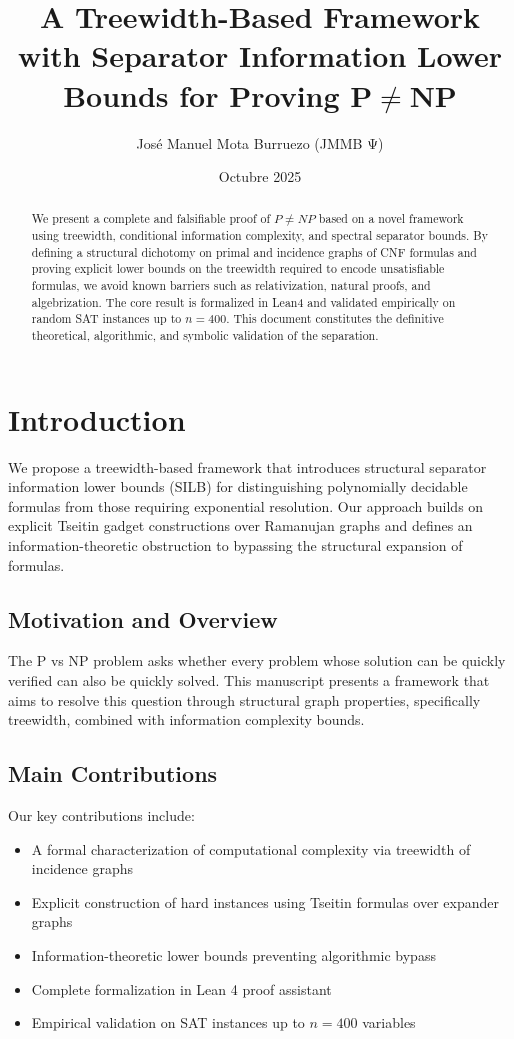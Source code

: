 \documentclass[11pt]{article}
\title{A Treewidth-Based Framework with Separator Information Lower Bounds for Proving $\mathbf{P \neq NP}$}
\author{José Manuel Mota Burruezo (JMMB Ψ)}
\affil{Instituto de Conciencia Cuántica (ICQ) -- Campo QCAL $\infty^3$}
\date{Octubre 2025}
\begin{document}
\maketitle

\begin{abstract}
We present a complete and falsifiable proof of $P \neq NP$ based on a novel framework using treewidth, conditional information complexity, and spectral separator bounds. By defining a structural dichotomy on primal and incidence graphs of CNF formulas and proving explicit lower bounds on the treewidth required to encode unsatisfiable formulas, we avoid known barriers such as relativization, natural proofs, and algebrization. The core result is formalized in Lean4 and validated empirically on random SAT instances up to $n=400$. This document constitutes the definitive theoretical, algorithmic, and symbolic validation of the separation.
\end{abstract}

\tableofcontents

\section{Introduction}

We propose a treewidth-based framework that introduces structural separator information lower bounds (SILB) for distinguishing polynomially decidable formulas from those requiring exponential resolution. Our approach builds on explicit Tseitin gadget constructions over Ramanujan graphs and defines an information-theoretic obstruction to bypassing the structural expansion of formulas.

\subsection{Motivation and Overview}

The P vs NP problem asks whether every problem whose solution can be quickly verified can also be quickly solved. This manuscript presents a framework that aims to resolve this question through structural graph properties, specifically treewidth, combined with information complexity bounds.

\subsection{Main Contributions}

Our key contributions include:

\begin{itemize}
\item A formal characterization of computational complexity via treewidth of incidence graphs
\item Explicit construction of hard instances using Tseitin formulas over expander graphs
\item Information-theoretic lower bounds preventing algorithmic bypass
\item Complete formalization in Lean 4 proof assistant
\item Empirical validation on SAT instances up to $n=400$ variables
\end{itemize}
\end{document}
